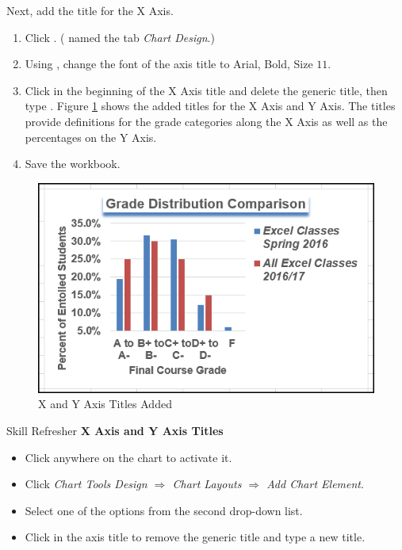 Next, add the title for the X Axis.

\begin{enumerate}
	\item Click . ( named the tab \textit{Chart Design}.)
	\item Using , change the font of the axis title to Arial, Bold, Size $ 11 $. 
	\item Click in the beginning of the X Axis title and delete the generic title, then type . Figure \ref{04:fig36} shows the added titles for the X Axis and Y Axis. The titles provide definitions for the grade categories along the X Axis as well as the percentages on the Y Axis.
	\item Save the workbook.
\end{enumerate}

\begin{figure}[H]
	\centering
	\includegraphics[width=\maxwidth{.95\linewidth}]{gfx/ch04_fig36}
	\caption{X and Y Axis Titles Added}
	\label{04:fig36}
\end{figure}

\begin{center}
	\begin{sklbox}{Skill Refresher}
		\textbf{X Axis and Y Axis Titles}
		\\
		\begin{itemize}
			\setlength{\itemsep}{0pt}
			\setlength{\parskip}{0pt}
			\setlength{\parsep}{0pt}

			\item Click anywhere on the chart to activate it.
			\item Click \textit{Chart Tools Design $ \Rightarrow $ Chart Layouts $ \Rightarrow $ Add Chart Element}.
			\item Select one of the options from the second drop-down list.
			\item Click in the axis title to remove the generic title and type a new title.
			
		\end{itemize}
	\end{sklbox}
\end{center}

